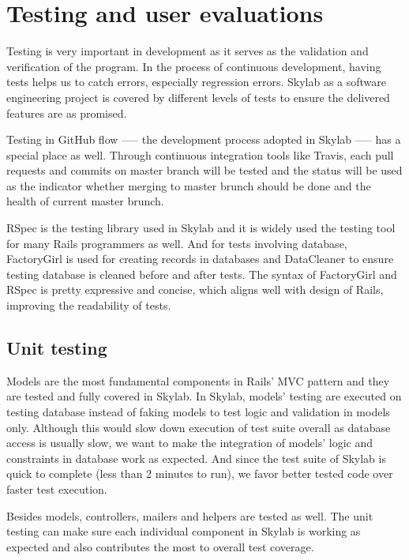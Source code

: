 \chapter{Testing and user evaluations} \label{testing}

Testing is very important in development as it serves as the validation and verification of the program\cite{citationtesting}. In the process of continuous development, having tests helps us to catch errors, especially regression errors. Skylab as a software engineering project is covered by different levels of tests to ensure the delivered features are as promised.

Testing in GitHub flow —-- the development process adopted in Skylab —-- has a special place as well. Through continuous integration tools like Travis, each pull requests and commits on master branch will be tested and the status will be used as the indicator whether merging to master brunch should be done and the health of current master brunch.

RSpec is the testing library used in Skylab and it is widely used the testing tool for many  Rails programmers as well\cite{citationrspec}. And for tests involving database, FactoryGirl is used for creating records in databases and DataCleaner to ensure testing database is cleaned before and after tests. The syntax of FactoryGirl and RSpec is pretty expressive and concise, which aligns well with design of Rails, improving the readability of tests.

\section{Unit testing} \label{unittesting}

Models are the most fundamental components in Rails' MVC pattern and they are tested and fully covered in Skylab. In Skylab, models' testing are executed on testing database instead of faking models to test logic and validation in models only. Although this would slow down execution of test suite overall as database access is usually slow, we want to make the integration of models' logic and constraints in database work as expected. And since  the test suite of Skylab is quick to complete (less than 2 minutes to run), we favor better tested code over faster test execution.

Besides models, controllers, mailers and helpers are tested as well. The unit testing can make sure each individual component in Skylab is working as expected and also contributes the most to overall test coverage.

